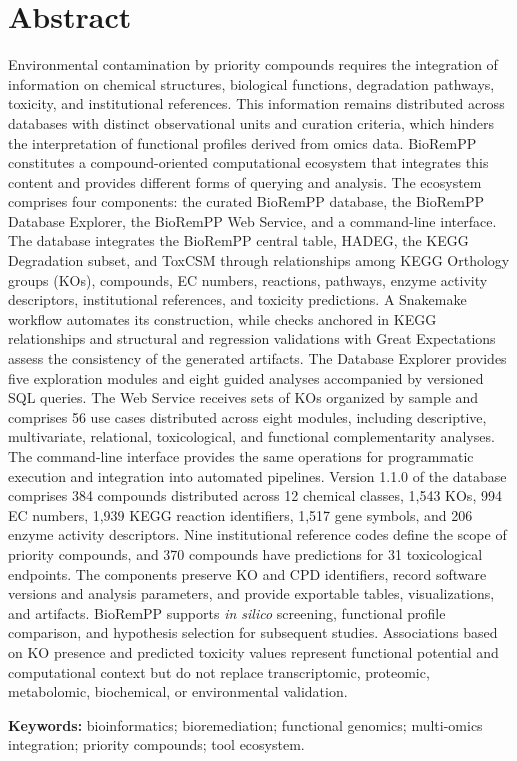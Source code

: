 \chapter*{Abstract}

\vspace{-1.2cm}
\enlargethispage{2\baselineskip}

Environmental contamination by priority compounds requires the integration of
information on chemical structures, biological functions, degradation
pathways, toxicity, and institutional references. This information remains
distributed across databases with distinct observational units and curation
criteria, which hinders the interpretation of functional profiles derived from
omics data. BioRemPP constitutes a compound-oriented computational ecosystem
that integrates this content and provides different forms of querying and
analysis. The ecosystem comprises four components: the curated BioRemPP
database, the BioRemPP Database Explorer, the BioRemPP Web Service, and a
command-line interface. The database integrates the BioRemPP central table,
HADEG, the KEGG Degradation subset, and ToxCSM through relationships among
KEGG Orthology groups (KOs), compounds, EC numbers, reactions, pathways,
enzyme activity descriptors, institutional references, and toxicity
predictions. A Snakemake workflow automates its construction, while checks
anchored in KEGG relationships and structural and regression validations with
Great Expectations assess the consistency of the generated artifacts. The
Database Explorer provides five exploration modules and eight guided analyses
accompanied by versioned SQL queries. The Web Service receives sets of KOs
organized by sample and comprises 56 use cases distributed across eight
modules, including descriptive, multivariate, relational, toxicological, and
functional complementarity analyses. The command-line interface provides the
same operations for programmatic execution and integration into automated
pipelines. Version 1.1.0 of the database comprises 384 compounds distributed
across 12 chemical classes, 1,543 KOs, 994 EC numbers, 1,939 KEGG reaction
identifiers, 1,517 gene symbols, and 206 enzyme activity descriptors. Nine
institutional reference codes define the scope of priority compounds, and 370
compounds have predictions for 31 toxicological endpoints. The components
preserve KO and CPD identifiers, record software versions and analysis
parameters, and provide exportable tables, visualizations, and artifacts.
BioRemPP supports \textit{in silico} screening, functional profile comparison,
and hypothesis selection for subsequent studies. Associations based on KO
presence and predicted toxicity values represent functional potential and
computational context but do not replace transcriptomic, proteomic,
metabolomic, biochemical, or environmental validation.

\vspace{0.35em}
\noindent\textbf{Keywords:} bioinformatics; bioremediation; functional
genomics; multi-omics integration; priority compounds; tool ecosystem.